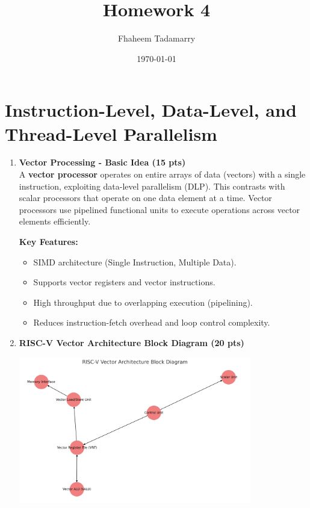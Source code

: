 \documentclass[11pt]{article}
\title{Homework 4}
\author{Fhaheem Tadamarry}
\date{\today}
\begin{document}
\maketitle

\section*{Instruction-Level, Data-Level, and Thread-Level Parallelism}

\begin{enumerate}

    \item \textbf{Vector Processing - Basic Idea (15 pts)} \\
    A \textbf{vector processor} operates on entire arrays of data (vectors) with a single instruction, exploiting data-level parallelism (DLP). This contrasts with scalar processors that operate on one data element at a time. Vector processors use pipelined functional units to execute operations across vector elements efficiently.

    \textbf{Key Features:}
    \begin{itemize}
        \item SIMD architecture (Single Instruction, Multiple Data).
        \item Supports vector registers and vector instructions.
        \item High throughput due to overlapping execution (pipelining).
        \item Reduces instruction-fetch overhead and loop control complexity.
    \end{itemize}

    \item \textbf{RISC-V Vector Architecture Block Diagram (20 pts)} \\
    \begin{center}
        \includegraphics[width=0.8\textwidth]{RISC-V Vector Architecture Block Diagram.png}
    \end{center}


\end{enumerate}
\end{document}
